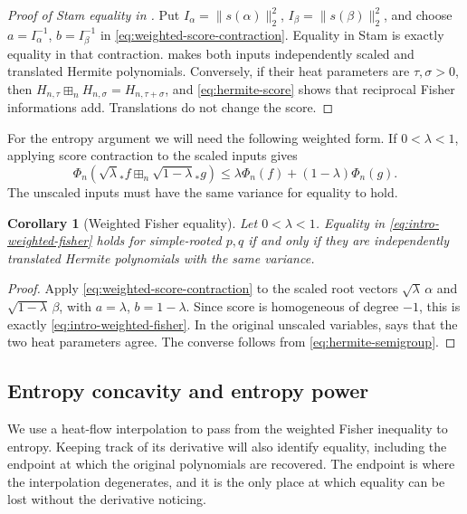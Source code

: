 \documentclass[12pt,reqno]{amsart}
\newtheorem{corollary}[corollary]{Corollary}
\theoremstyle{definition}
\theoremstyle{remark}
\begin{document}
\begin{proof}[Proof of Stam equality in ]
Put
\(I_\alpha=\lVert s(\alpha)\rVert_2^2\),
\(I_\beta=\lVert s(\beta)\rVert_2^2\), and choose
\(a=I_\alpha^{-1}\), \(b=I_\beta^{-1}\) in
\eqref{eq:weighted-score-contraction}.  Equality in Stam is exactly
equality in that contraction.   makes
both inputs independently scaled and translated Hermite polynomials.
Conversely, if their heat parameters are \(\tau,\sigma>0\), then
\(H_{n,\tau}\boxplus_nH_{n,\sigma}=H_{n,\tau+\sigma}\), and
\eqref{eq:hermite-score} shows that reciprocal Fisher informations add.
Translations do not change the score.
\end{proof}

For the entropy argument we will need the following weighted form.  If
\(0<\lambda<1\), applying score contraction to the scaled inputs gives
\begin{equation}\label{eq:intro-weighted-fisher}
 \Phi_n\!\left(\sqrt\lambda_*f\boxplus_n
                 \sqrt{1-\lambda}_*g\right)
 \leq\lambda\Phi_n(f)+(1-\lambda)\Phi_n(g).
\end{equation}
The unscaled inputs must have the same variance for equality to hold.

\begin{corollary}[Weighted Fisher equality]
\label{cor:weighted-fisher-equality}
Let \(0<\lambda<1\).  Equality in \eqref{eq:intro-weighted-fisher} holds
for simple-rooted \(p,q\) if and only if they are independently translated
Hermite polynomials with the same variance.
\end{corollary}

\begin{proof}
Apply \eqref{eq:weighted-score-contraction} to the scaled root vectors
\(\sqrt\lambda\,\alpha\) and \(\sqrt{1-\lambda}\,\beta\), with
\(a=\lambda\), \(b=1-\lambda\).  Since score is homogeneous of degree
\(-1\), this is exactly \eqref{eq:intro-weighted-fisher}.  In the original
unscaled variables,  says that the two
heat parameters agree.  The converse follows from
\eqref{eq:hermite-semigroup}.
\end{proof}

\subsection{Entropy concavity and entropy power}\label{sec:entropy-power}

We use a heat-flow interpolation to pass from the weighted Fisher
inequality to entropy.  Keeping track of its derivative will also identify
equality, including the endpoint at which the original polynomials are
recovered. The endpoint is where the interpolation degenerates, and it is the only place at which equality can be lost without the derivative noticing.
\end{document}
